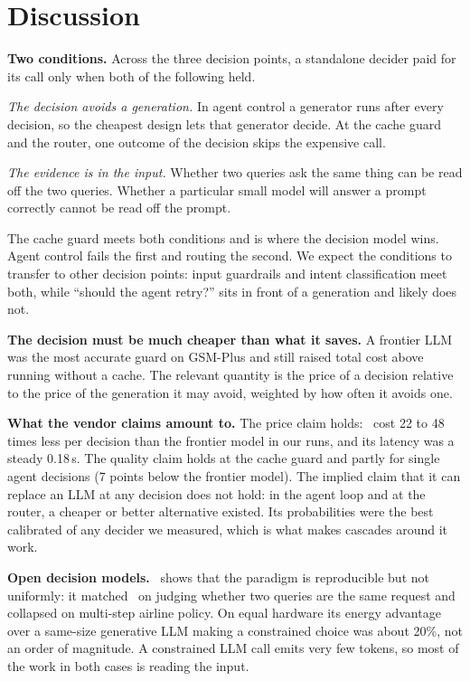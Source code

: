 \section{Discussion}
\label{sec:discussion}

\textbf{Two conditions.}
Across the three decision points, a standalone decider paid for its call only when both of the following held.

\emph{The decision avoids a generation.}
In agent control a generator runs after every decision, so the cheapest design lets that generator decide.
At the cache guard and the router, one outcome of the decision skips the expensive call.

\emph{The evidence is in the input.}
Whether two queries ask the same thing can be read off the two queries.
Whether a particular small model will answer a prompt correctly cannot be read off the prompt.

The cache guard meets both conditions and is where the decision model wins.
Agent control fails the first and routing the second.
We expect the conditions to transfer to other decision points: input guardrails and intent classification meet both, while ``should the agent retry?'' sits in front of a generation and likely does not.

\textbf{The decision must be much cheaper than what it saves.}
A frontier LLM was the most accurate guard on GSM-Plus and still raised total cost above running without a cache.
The relevant quantity is the price of a decision relative to the price of the generation it may avoid, weighted by how often it avoids one.

\textbf{What the vendor claims amount to.}
The price claim holds: \jev\ cost 22 to 48 times less per decision than the frontier model in our runs, and its latency was a steady 0.18\,s.
The quality claim holds at the cache guard and partly for single agent decisions (7 points below the frontier model).
The implied claim that it can replace an LLM at any decision does not hold: in the agent loop and at the router, a cheaper or better alternative existed.
Its probabilities were the best calibrated of any decider we measured, which is what makes cascades around it work.

\textbf{Open decision models.}
\kev\ shows that the paradigm is reproducible but not uniformly: it matched \jev\ on judging whether two queries are the same request and collapsed on multi-step airline policy.
On equal hardware its energy advantage over a same-size generative LLM making a constrained choice was about 20\%, not an order of magnitude.
A constrained LLM call emits very few tokens, so most of the work in both cases is reading the input.

